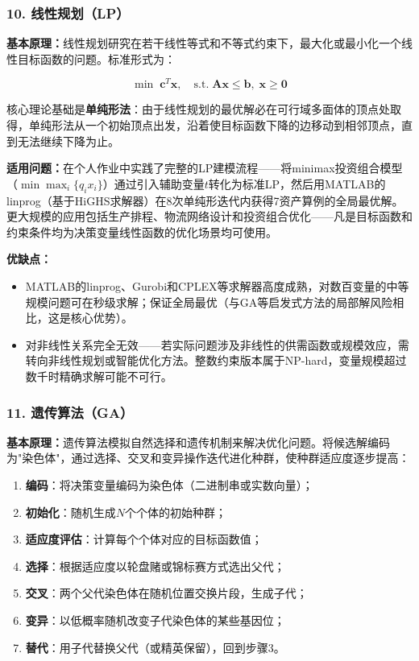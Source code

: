 \documentclass[12pt,a4paper]{ctexart}
\begin{document}
\subsubsection{10. 线性规划（LP）}

\textbf{基本原理：}线性规划研究在若干线性等式和不等式约束下，最大化或最小化一个线性目标函数的问题。标准形式为：

\begin{equation}
\min \; \mathbf{c}^T \mathbf{x}, \quad \text{s.t.} \; \mathbf{A}\mathbf{x} \leq \mathbf{b}, \; \mathbf{x} \geq \mathbf{0}
\end{equation}

核心理论基础是\textbf{单纯形法}：由于线性规划的最优解必在可行域多面体的顶点处取得，单纯形法从一个初始顶点出发，沿着使目标函数下降的边移动到相邻顶点，直到无法继续下降为止。

\textbf{适用问题：}在个人作业中实践了完整的LP建模流程——将minimax投资组合模型（$\min \max_i \{q_i x_i\}$）通过引入辅助变量$t$转化为标准LP，然后用MATLAB的linprog（基于HiGHS求解器）在8次单纯形迭代内获得7资产算例的全局最优解。更大规模的应用包括生产排程、物流网络设计和投资组合优化——凡是目标函数和约束条件均为决策变量线性函数的优化场景均可使用。

\textbf{优缺点：}
\begin{itemize}[leftmargin=*]
    \item[+] MATLAB的linprog、Gurobi和CPLEX等求解器高度成熟，对数百变量的中等规模问题可在秒级求解；保证全局最优（与GA等启发式方法的局部解风险相比，这是核心优势）。
    \item[$-$] 对非线性关系完全无效——若实际问题涉及非线性的供需函数或规模效应，需转向非线性规划或智能优化方法。整数约束版本属于NP-hard，变量规模超过数千时精确求解可能不可行。
\end{itemize}

\subsubsection{11. 遗传算法（GA）}

\textbf{基本原理：}遗传算法模拟自然选择和遗传机制来解决优化问题。将候选解编码为"染色体"，通过选择、交叉和变异操作迭代进化种群，使种群适应度逐步提高：

\begin{enumerate}[label=(\arabic*), leftmargin=*]
    \item \textbf{编码}：将决策变量编码为染色体（二进制串或实数向量）；
    \item \textbf{初始化}：随机生成$N$个个体的初始种群；
    \item \textbf{适应度评估}：计算每个个体对应的目标函数值；
    \item \textbf{选择}：根据适应度以轮盘赌或锦标赛方式选出父代；
    \item \textbf{交叉}：两个父代染色体在随机位置交换片段，生成子代；
    \item \textbf{变异}：以低概率随机改变子代染色体的某些基因位；
    \item \textbf{替代}：用子代替换父代（或精英保留），回到步骤3。
\end{enumerate}
\end{document}
